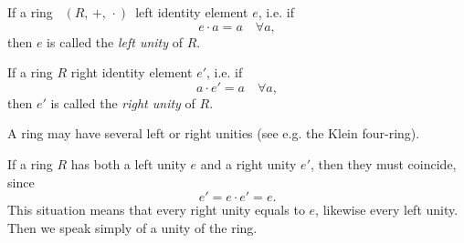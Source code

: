 \documentclass[12pt]{article}
\theoremstyle{definition}
\begin{document}
If a ring \, $(R,\,+,\,\cdot)$\,  left identity element $e$, i.e. if
                $$e\cdot a = a \quad \forall a,$$
then $e$ is called the {\em left unity} of $R$.

If a ring $R$  right identity element $e'$, i.e. if
                $$a\cdot e' = a \quad \forall a,$$
then $e'$ is called the {\em right unity} of $R$.

A ring may have several left or right unities (see e.g. the Klein four-ring).

If a ring $R$ has both a left unity $e$ and a right unity $e'$, then they must coincide, since
                  $$e' = e\cdot e' = e.$$
This situation means that every right unity equals to $e$, likewise every left unity. \,Then we speak simply of a unity of the ring.
\end{document}
